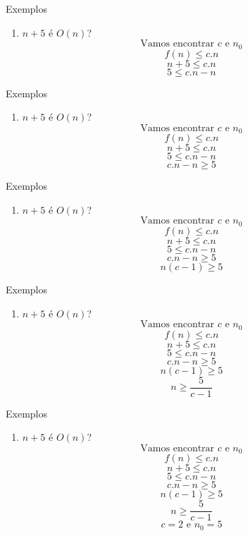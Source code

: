 \documentclass{beamer}
\newcounter{saveenumi}
\newcommand{\seti}{\setcounter{saveenumi}{\value{enumi}}}
\begin{document}
\begin{frame}{Exemplos}
    \begin{enumerate}
     \item $n+5$ é $O(n)$?
     $$\text{Vamos encontrar } c \text{ e } n_0 $$
     $$f(n) \leq c.n$$
     $$n+5 \leq c.n$$
     $$5 \leq c.n - n$$
     
    \end{enumerate}
\end{frame}

\begin{frame}{Exemplos}
    \begin{enumerate}
     \item $n+5$ é $O(n)$?
     $$\text{Vamos encontrar } c \text{ e } n_0 $$
     $$f(n) \leq c.n$$
     $$n+5 \leq c.n$$
     $$5 \leq c.n - n$$
     $$ c.n - n\geq 5$$
     
     \end{enumerate}
\end{frame}

\begin{frame}{Exemplos}
    \begin{enumerate}
     \item $n+5$ é $O(n)$?
     $$\text{Vamos encontrar } c \text{ e } n_0 $$
     $$f(n) \leq c.n$$
     $$n+5 \leq c.n$$
     $$5 \leq c.n - n$$
     $$ c.n - n\geq 5$$
     $$ n(c-1)\geq 5$$
   
    \end{enumerate}
\end{frame}


\begin{frame}{Exemplos}
    \begin{enumerate}
     \item $n+5$ é $O(n)$?
     $$\text{Vamos encontrar } c \text{ e } n_0 $$
     $$f(n) \leq c.n$$
     $$n+5 \leq c.n$$
     $$5 \leq c.n - n$$
     $$ c.n - n\geq 5$$
     $$ n(c-1)\geq 5$$
     $$ n \geq \dfrac{5}{c-1}$$
    
    \end{enumerate}
\end{frame}

\begin{frame}{Exemplos}
    \begin{enumerate}
     \item $n+5$ é $O(n)$?
     $$\text{Vamos encontrar } c \text{ e } n_0 $$
     $$f(n) \leq c.n$$
     $$n+5 \leq c.n$$
     $$5 \leq c.n - n$$
     $$ c.n - n\geq 5$$
     $$ n(c-1)\geq 5$$
     $$ n \geq \dfrac{5}{c-1}$$
     $$c = 2 \text{ e } n_0 =  5$$
     \seti
    \end{enumerate}
\end{frame}
\end{document}
